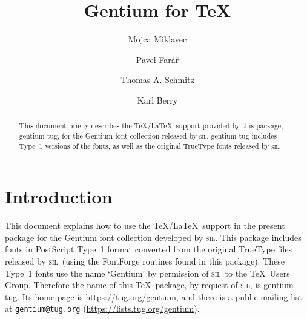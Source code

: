 \documentclass[12pt, english]{article}
\title{Gentium for \TeX}
\author{Mojca Miklavec \and Pavel Farář
        \and Thomas A. Schmitz \and Karl Berry}
\date{\dyddiad}
\begin{document}
\maketitle
\thispagestyle{empty}
\setlength{\parindent}{0pt}
\setlength{\parskip}{0.5em}
	
	
\newcommand*{\sil}{\textsc{sil}}
\newcommand*{\pkgname}[1]{\textsf{#1}}
\newcommand*{\fname}[1]{\textsf{#1}}

\begin{abstract}\raggedright\noindent
	This document briefly describes the \TeX/\LaTeX\ support
	provided by this package, \pkgname{gentium-tug}, for the Gentium
	font collection released by \sil. \pkgname{gentium-tug} includes
	Type~1 versions of the fonts, as well as the original TrueType
	fonts released by \sil.
\end{abstract}

\tableofcontents

\section{Introduction}


This document explains how to use the \TeX/\LaTeX\ support in
the present package for the Gentium font collection developed by \sil.
This package includes fonts in PostScript Type~1 format converted from
the original TrueType files released by \sil\ (using the FontForge
routines found in this package).  These Type~1 fonts use the name
`Gentium' by permission of \sil\ to the \TeX\ Users Group.  Therefore
the name of this \TeX\ package, by request of \sil, is
\pkgname{gentium-tug}.  Its home page is \url{https://tug.org/gentium},
and there is a public mailing list at \texttt{gentium@tug.org}
(\url{https://lists.tug.org/gentium}).
\end{document}
